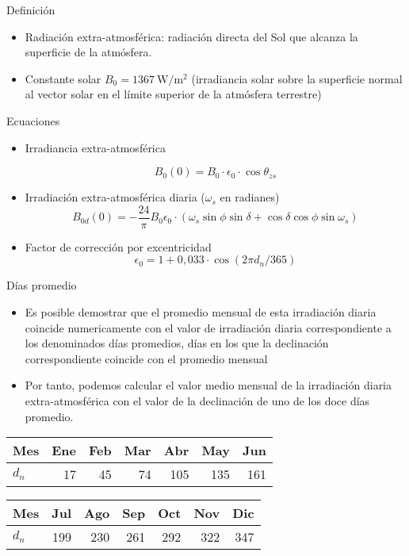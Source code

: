 \documentclass[xcolor={usenames,svgnames,dvipsnames}]{beamer}
\begin{document}
\begin{frame}[label={sec:org614b47c}]{Definición}
\begin{itemize}
\item \alert{Radiación extra-atmosférica}: radiación directa del Sol que alcanza la superficie de la atmósfera.

\item \alert{Constante solar} \(B_{0}=\SI{1367}{\watt\per\meter\squared}\) (irradiancia solar sobre la superficie normal al vector solar en el límite superior de la atmósfera terrestre)
\end{itemize}
\end{frame}
\begin{frame}[label={sec:orgd2638db}]{Ecuaciones}
\begin{itemize}
\item \alert{Irradiancia extra-atmosférica}

\[B_{0}(0)=B_{0}\cdot\epsilon_{0}\cdot\cos\theta_{zs}\]

\item \alert{Irradiación extra-atmosférica diaria}  (\(\omega_{s}\) en radianes)
\[
  B_{0d}(0)=-\frac{24}{\pi}B_{0}\epsilon_{0}\cdot\left(\omega_{s}\sin\phi\sin\delta+\cos\delta\cos\phi\sin\omega_{s}\right)
\]

\item Factor de corrección por excentricidad
\[\epsilon_0 = 1+0,033\cdot\cos(2\pi d_n/365)\]
\end{itemize}
\end{frame}


\begin{frame}[label={sec:org95334a9}]{Días promedio}
\begin{itemize}
\item Es posible demostrar que el \alert{promedio mensual} de esta irradiación
diaria \alert{coincide numericamente} con el valor de irradiación diaria
correspondiente a los denominados \alert{días promedios}, días en los que
la declinación correspondiente coincide con el promedio mensual

\item Por tanto, podemos calcular el valor medio mensual de la irradiación
diaria extra-atmosférica con el valor de la declinación de uno de los
doce días promedio.
\end{itemize}

\begin{center}
\begin{tabular}{lrrrrrr}
Mes & Ene & Feb & Mar & Abr & May & Jun\\
\hline
\(d_n\) & 17 & 45 & 74 & 105 & 135 & 161\\
\end{tabular}
\end{center}

\begin{center}
\begin{tabular}{lrrrrrr}
Mes & Jul & Ago & Sep & Oct & Nov & Dic\\
\hline
\(d_n\) & 199 & 230 & 261 & 292 & 322 & 347\\
\end{tabular}
\end{center}
\end{frame}
\end{document}
